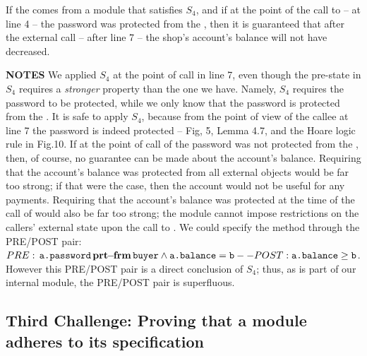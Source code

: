 \noindent
 
If the  comes from a module that satisfies $S_4$, and if at the point of the call to  -- \ie at line 4 -- the password was protected from the , then it is guaranteed that after the external call -- \ie after line 7 --  the shop's account's balance will not have decreased.

 

\vspace{.1cm}

  \noindent
 \textbf{NOTES}
 \notesep We   applied $S_4$ at the point of call in line 7, even   though  
 the pre-state in $S_4$ requires %
 a \emph{stronger} property than the one we have.
 Namely,   $S_4$ requires   the password to be protected, while we only know 
  that the password is protected from the  .
It is safe to apply $S_4$,  because from the point of view of the callee at line 7 the password is indeed protected -- \cf Fig, 5,   Lemma 4.7, and the 
  Hoare logic rule in Fig.10.
  \notesep  If at the point of call of  the password was not protected from the , then, of course, no guarantee can be made about the account's balance.
 \notesep Requiring that the account's balance was protected from all external objects would be far too strong; if that were the case, then the account would not be useful for any payments.
 \notesep Requiring that the account's balance was protected at the time of the call of  would also be far too strong; the module cannot impose restrictions on the callers' external state  upon the call to .
 \notesep 
 We could specify the method  through the PRE/POST pair: $PRE: {\, {\texttt{a.password}}\, \mathbf{prt\!\!-\!\!frm}\, {\texttt{buyer}}} \wedge {{\texttt{a.balance}}}={\texttt{b}} -- POST: {\texttt{a.balance}}\geq {\texttt{b}}$. However this PRE/POST pair is a direct conclusion of $S_4$; thus, as  is part of our internal module, the PRE/POST pair is superfluous.
 
 
 \subsection{Third Challenge: Proving that a module adheres to its specification}
 \label{sec:howThird}
 
